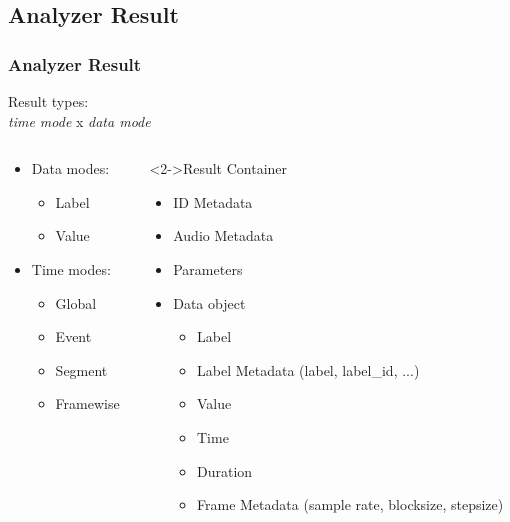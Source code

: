 \documentclass[10pt, final, hyperref, table]{beamer}
\begin{document}
\subsection{Analyzer Result}
\begin{frame}
  \frametitle{Analyzer Result}
     \begin{block}{Result types: \\\emph{time mode} x \emph{data mode}}
       \begin{columns}
         \begin{column}{0.35\linewidth}
           \begin{itemize}
           \item Data modes:
             \begin{itemize}
             \item \alert<2-5>{Label}
             \item \alert<6-9>{Value}
             \end{itemize}
           \item Time modes:
             \begin{itemize}
             \item \alert<2,6>{Global}
             \item \alert<3,7>{Event}
             \item \alert<4,8>{Segment}
             \item \alert<5,9>{Framewise}
             \end{itemize}
           \end{itemize}
         \end{column}
         \begin{column}{0.50\linewidth}\footnotesize
           \begin{exampleblock}<2->{\footnotesize Result Container}\scriptsize
             \begin{itemize}
             \item ID Metadata
             \item Audio Metadata
             \item Parameters
             \item Data object
               \begin{itemize}\scriptsize
               \item<2-5> Label
               \item<2-5> Label Metadata ({\tiny label, label\_id, ...})
               \item<6-9> Value
               \item<3-4,7-8> Time
               \item<4,8> Duration
               \item<5,9> Frame Metadata ({\tiny sample rate, blocksize,
                 stepsize})
               \end{itemize}
           

\end{itemize}
\end{exampleblock}
\end{column}
\end{columns}
\end{block}
\end{frame}
\end{document}
